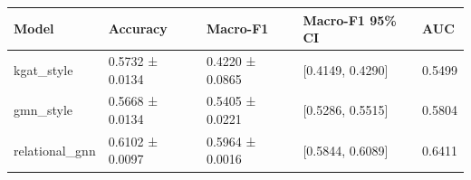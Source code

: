 \begin{tabular}{lllll}
\toprule
Model & Accuracy & Macro-F1 & Macro-F1 95\% CI & AUC \\
\midrule
kgat\_style & 0.5732 ± 0.0134 & 0.4220 ± 0.0865 & [0.4149, 0.4290] & 0.5499 \\
gmn\_style & 0.5668 ± 0.0134 & 0.5405 ± 0.0221 & [0.5286, 0.5515] & 0.5804 \\
relational\_gnn & 0.6102 ± 0.0097 & 0.5964 ± 0.0016 & [0.5844, 0.6089] & 0.6411 \\
\bottomrule
\end{tabular}
